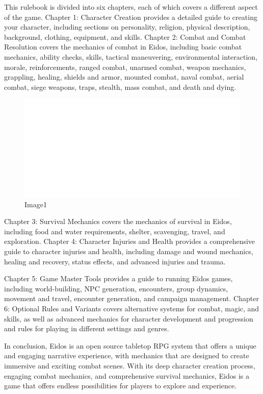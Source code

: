 This rulebook is divided into six chapters, each of which covers a
different aspect of the game. Chapter 1: Character Creation provides a
detailed guide to creating your character, including sections on
personality, religion, physical description, background, clothing,
equipment, and skills. Chapter 2: Combat and Combat Resolution covers
the mechanics of combat in Eidos, including basic combat mechanics,
ability checks, skills, tactical maneuvering, environmental interaction,
morale, reinforcements, ranged combat, unarmed combat, weapon mechanics,
grappling, healing, shields and armor, mounted combat, naval combat,
aerial combat, siege weapons, traps, stealth, mass combat, and death and
dying.

\begin{figure}
\centering
\includegraphics{./images/index02.svg}
\caption{Image1}
\end{figure}

Chapter 3: Survival Mechanics covers the mechanics of survival in Eidos,
including food and water requirements, shelter, scavenging, travel, and
exploration. Chapter 4: Character Injuries and Health provides a
comprehensive guide to character injuries and health, including damage
and wound mechanics, healing and recovery, status effects, and advanced
injuries and trauma.

Chapter 5: Game Master Tools provides a guide to running Eidos games,
including world-building, NPC generation, encounters, group dynamics,
movement and travel, encounter generation, and campaign management.
Chapter 6: Optional Rules and Variants covers alternative systems for
combat, magic, and skills, as well as advanced mechanics for character
development and progression and rules for playing in different settings
and genres.

In conclusion, Eidos is an open source tabletop RPG system that offers a
unique and engaging narrative experience, with mechanics that are
designed to create immersive and exciting combat scenes. With its deep
character creation process, engaging combat mechanics, and comprehensive
survival mechanics, Eidos is a game that offers endless possibilities
for players to explore and experience.

